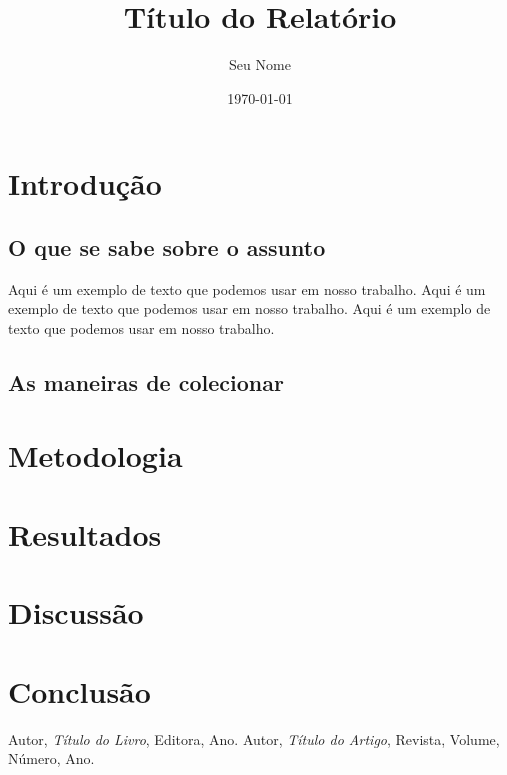 \documentclass[a4paper,12pt]{report}
\title{Título do Relatório}
\author{Seu Nome}
\date{\today}
\begin{document}
\maketitle

\tableofcontents

\newpage

\chapter{Introdução}

\section{O que se sabe sobre  o assunto}
Aqui é um exemplo de texto que podemos usar em nosso trabalho. Aqui é um exemplo de texto que podemos usar em nosso trabalho. Aqui é um exemplo de texto que podemos usar em nosso trabalho.

\section{As maneiras de colecionar}
\lipsum[2-3]

\chapter{Metodologia}
\lipsum[4-5]

\chapter{Resultados}
\lipsum[6-7]

\chapter{Discussão}
\lipsum[8-9]

\chapter{Conclusão}
\lipsum[10]

\begin{thebibliography}{9}
 Autor, \textit{Título do Livro}, Editora, Ano.
 Autor, \textit{Título do Artigo}, Revista, Volume, Número, Ano.
\end{thebibliography}
\end{document}
